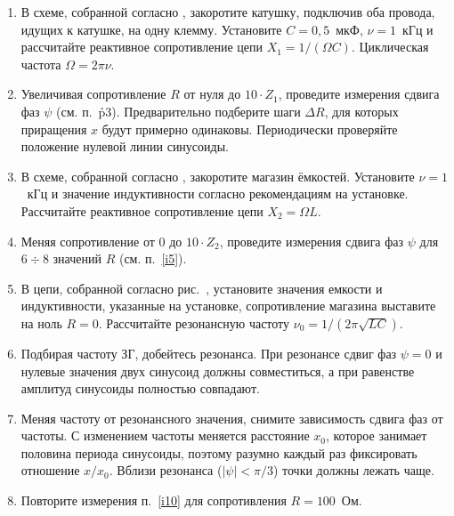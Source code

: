 \begin{lab:task}
\begin{enumerate}
	\item В схеме, собранной согласно , закоротите катушку,
подключив оба провода, идущих к катушке, на одну клемму.
	Установите $C=0,5$~мкФ, $\nu=1$~кГц и рассчитайте реактивное сопротивление
цепи $X_1=1/(\Omega C)$. Циклическая частота
	$\Omega=2\pi\nu$.

	\item \label{i5} Увеличивая сопротивление $R$ от нуля до $10\cdot Z_1$,
проведите измерения сдвига фаз $\psi$ (см. п.~\r{p3}).
	Предварительно подберите шаги $\Delta R$, для которых приращения $x$ будут
примерно одинаковы. Периодически проверяйте
	положение нулевой линии синусоиды.


	\item В схеме, собранной согласно , закоротите магазин
ёмкостей. Установите  $\nu=1$~кГц и значение индуктивности согласно
рекомендациям на установке. Рассчитайте реактивное сопротивление цепи
$X_2=\Omega L$.

	\item Меняя сопротивление от 0 до $10\cdot Z_2$, проведите измерения сдвига
фаз $\psi$ для $6\div8$ значений $R$ (см.
	п.~\ref{i5}).


	\item В цепи, собранной согласно рис.~, установите значения
емкости и индуктивности, указанные на установке, сопротивление магазина
выставите на ноль
	$R=0$. Рассчитайте резонансную частоту $\nu_0=1/(2\pi\sqrt{LC})$.

	\item Подбирая частоту ЗГ, добейтесь резонанса. При резонансе сдвиг фаз
$\psi=0$ и нулевые значения двух синусоид должны
	совместиться, а при равенстве амплитуд синусоиды полностью совпадают.

	\item \label{i10} Меняя частоту  от резонансного
значения, снимите зависимость сдвига фаз от частоты. С
	изменением частоты меняется расстояние $x_0$, которое занимает половина
периода синусоиды, поэтому разумно каждый раз
	фиксировать отношение $x/x_0$. Вблизи резонанса ($|\psi|<\pi/3$) точки
должны лежать чаще.

	\item Повторите измерения п.~\ref{i10} для сопротивления $R=100$~Ом.


\end{enumerate}
\end{lab:task}
